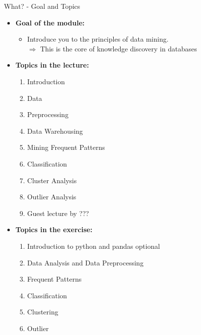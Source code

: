 \begin{frame}{What? - Goal and Topics}
	\begin{itemize}
		\item \textbf{Goal of the module:}
		      \begin{itemize}
			      \item Introduce you to the principles of data mining. \\
			            $\Rightarrow$ This is the core of knowledge discovery in databases
		      \end{itemize}
		\item \textbf{Topics in the lecture:}
		      \vspace*{-1\multicolsep}
		      \begin{multicols}{2}
			      \begin{enumerate}
				      \item Introduction
				      \item Data
				      \item Preprocessing
				      \item Data Warehousing
				      \item Mining Frequent Patterns
				      \item Classification
				      \item Cluster Analysis
				      \item Outlier Analysis
				      \item {\color{gray}Guest lecture by ???}
			      \end{enumerate}
		      \end{multicols}
		      \vspace*{-1\multicolsep}
		\item \textbf{Topics in the exercise:}
		      \vspace*{-1\multicolsep}
		      \begin{multicols}{2}
			      \begin{enumerate}
				      \item Introduction to python and pandas {\color{gray}optional}
				      \item Data Analysis and Data Preprocessing
				      \item Frequent Patterns
				      \item Classification
				      \item Clustering
				      \item Outlier
			      \end{enumerate}
		      \end{multicols}
		      \
	\end{itemize}
\end{frame}

